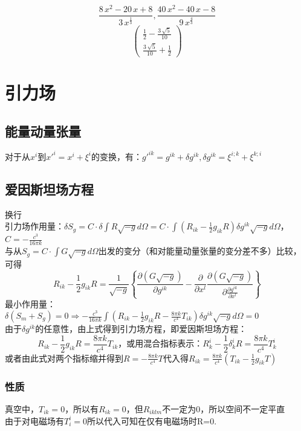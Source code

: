 \documentclass{report}
\newcommand{\huawenxingkai}{\CJKfamily{hwxk}}
\newcommand{\xkuo}[1]{\left(#1\right)}
\newcommand{\dkuo}[1]{\left\lbrace#1\right\rbrace}
\newcommand{\piandao}[2][]{\frac{\partial #1}{\partial #2}}
\begin{document}
	\[\frac{8\, x^2 - 20\, x + 8}{3\, x^{\frac{1}{3}}}, \frac{  40\, x^2 - 40\, x - 8}{9\, x^{\frac{4}{3}}}\]
	\[\left(\begin{array}{c} \frac{1}{2} - \frac{3\, \sqrt{5}}{10}\\ \frac{3\, \sqrt{5}}{10} + \frac{1}{2} \end{array}\right)\]
	\huawenxingkai\small
	\section{引力场}
	\subsection{能量动量张量}
	对于从$ x^i $到$ x'^i=x^i+\xi^i $的变换，有：$ g'^{ik}=g^{ik}+\delta g^{ik},\delta g^{ik}=\xi^{i;k}+\xi^{k;i} $
	\subsection{爱因斯坦场方程}
	换行\\
	引力场作用量：$ \delta S_g=C\cdot\delta \int R\sqrt{-g}d\Omega=C\cdot\int\xkuo{R_{ik}-\frac{1}{2}g_{ik}R}\delta g^{ik}\sqrt{-g}d\Omega$，$ C=-\frac{c^3}{16 \pi k} $\\
	与从$ S_g=C\cdot\int G\sqrt{-g}d\Omega $出发的变分（和对能量动量张量的变分差不多）比较，可得$$ R_{ik}-\frac{1}{2}g_{ik}R=\frac{1}{\sqrt{-g}}\dkuo{\piandao[\xkuo{G\sqrt{-g}}]{g^{ik}}-\piandao{x^l}\piandao[\xkuo{G\sqrt{-g}}]{\piandao[g^{ik}]{x^l}}} $$
	最小作用量：$\delta \xkuo{S_m+S_g}=0\Rightarrow-\frac{c^3}{16 \pi k}\int\xkuo{R_{ik}-\frac{1}{2}g_{ik}R-\frac{8\pi k}{c^4}T_{ik}}\delta g^{ik}\sqrt{-g}d\Omega=0 $\\
	由于$ \delta g^{ik} $的任意性，由上式得到引力场方程，即爱因斯坦场方程：$$ R_{ik}-\frac{1}{2}g_{ik}R=\frac{8\pi k}{c^4}T_{ik} \text{，或用混合指标表示：}R^i_{k}-\frac{1}{2}\delta^i_kR=\frac{8\pi k}{c^4}T^i_k $$
	或者由此式对两个指标缩并得到$ R=-\frac{8\pi k}{c^4}T $代入得$ R_{ik}=\frac{8\pi k}{c^4}\xkuo{T_{ik}-\frac{1}{2}g_{ik}T} $
	\subsubsection{性质}
	真空中，$ T_{ik}=0 $，所以有$ R_{ik}=0 $，但$ R_{iklm} $不一定为0，所以空间不一定平直\\
	由于对电磁场有$ T^i_i=0 $所以代入可知在仅有电磁场时R=0.
\end{document}
